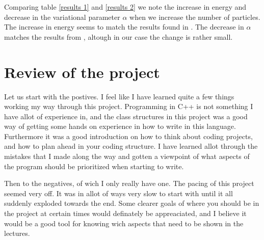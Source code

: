 \documentclass[a4paper, 10pt, english]{revtex4-2} %
\begin{document}
    Comparing table \ref{results 1} and \ref{results 2} we note the increase in energy and decrease in the variational parameter $\alpha$ when we increase the number of particles.
    The increase in energy seems to match the results found in \cite{dubois2001bose}.
    The decrease in $\alpha$ matches the results from \cite{nilsen2005vortices}, altough in our case the change is rather small.


\section{Review of the project}
    Let us start with the postives.
    I feel like I have learned quite a few things working my way through this project.
    Programming in C++ is not something I have allot of experience in, and the class structures in this project was a good way of getting some hands on experience in how to write in this language.
    Furthermore it was a good introduction on how to think about coding projects, and how to plan ahead in your coding structure.
    I have learned allot through the mistakes that I made along the way and gotten a viewpoint of what aspects of the program should be prioritized when starting to write.

    Then to the negatives, of wich I only really have one.
    The pacing of this project seemed very off.
    It was in allot of ways very slow to start with until it all suddenly exploded towards the end.
    Some clearer goals of where you should be in the project at certain times would definately be appreaciated, and I believe it would be a good tool for knowing wich aspects that need to be shown in the lectures.



\end{document}
